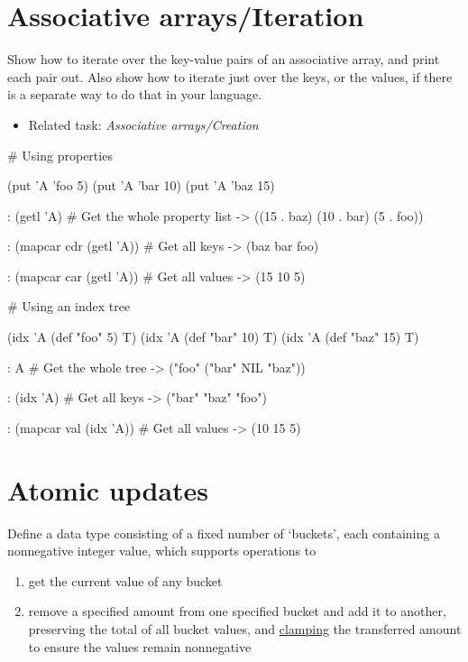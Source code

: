 \pagebreak{}
\section*{Associative arrays/Iteration}

Show how to iterate over the key-value pairs of an associative array,
and print each pair out. Also show how to iterate just over the keys, or
the values, if there is a separate way to do that in your language.

\begin{itemize}
\item
  Related task: \emph{Associative arrays/Creation}
\end{itemize}


\begin{wideverbatim}

# Using properties

(put 'A 'foo 5)
(put 'A 'bar 10)
(put 'A 'baz 15)

: (getl 'A)                            # Get the whole property list
-> ((15 . baz) (10 . bar) (5 . foo))

: (mapcar cdr (getl 'A))               # Get all keys
-> (baz bar foo)

: (mapcar car (getl 'A))               # Get all values
-> (15 10 5)

# Using an index tree

(idx 'A (def "foo" 5) T)
(idx 'A (def "bar" 10) T)
(idx 'A (def "baz" 15) T)

: A                                    # Get the whole tree
-> ("foo" ("bar" NIL "baz"))

:  (idx 'A)                            # Get all keys
-> ("bar" "baz" "foo")

:  (mapcar val (idx 'A))               # Get all values
-> (10 15 5)

\end{wideverbatim}

\pagebreak{}
\section*{Atomic updates}

Define a data type consisting of a fixed number of `buckets', each
containing a nonnegative integer value, which supports operations to

\begin{enumerate}
\item
  get the current value of any bucket
\item
  remove a specified amount from one specified bucket and add it to
  another, preserving the total of all bucket values, and
  \href{http://en.wikipedia.org/wiki/Clamping\_(graphics)}{clamping} the
  transferred amount to ensure the values remain nonnegative
\end{enumerate}

